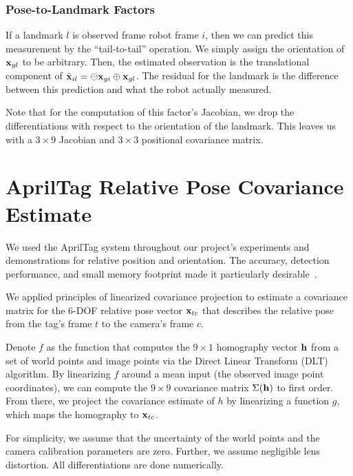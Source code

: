 \documentclass[conference]{IEEEtran}
\begin{document}
\subsubsection{Pose-to-Landmark Factors}
\label{subs:pointnodelinear}

If a landmark $l$ is observed frame robot frame $i$, then we can predict this measurement
by the ``tail-to-tail'' operation.  We simply assign the orientation of ${\bf x}_{gl}$ to
be arbitrary.  Then, the estimated observation is the translational component of $ {\hat
  {\bf x}}_{il} = \ominus {\bf x}_{gi} \oplus {\bf x}_{gl} $. The residual for the
landmark is the difference between this prediction and what the robot actually measured.

Note that for the computation of this factor's Jacobian, we drop the differentiations with
respect to the orientation of the landmark.  This leaves us with a $3 \times 9$ Jacobian
and $3 \times 3$ positional covariance matrix. 

\section{AprilTag Relative Pose Covariance Estimate}
\label{sec:apriltags}


We used the AprilTag system throughout our project's experiments and demonstrations for
relative position and orientation.  The accuracy, detection performance, and small memory
footprint made it particularly desirable~\cite{olson2011tags}.

We applied principles of linearized covariance projection to estimate a covariance matrix
for the 6-DOF relative pose vector ${\bf x}_{tc}$ that describes the relative pose from
the tag's frame $t$ to the camera's frame $c$.

Denote $f$ as the function that computes the $9 \times 1$ homography vector ${\bf h}$ from
a set of world points and image points via the Direct Linear Transform (DLT) algorithm.
By linearizing $f$ around a mean input (the observed image point coordinates), we can
compute the $9 \times 9$ covariance matrix $\Sigma({\bf h})$ to first order.  From there,
we project the covariance estimate of $h$ by linearizing a function $g$, which maps the
homography to ${\bf x}_{tc}$.

For simplicity, we assume that the uncertainty of the world points and the camera
calibration parameters are zero.  Further, we assume negligible lens distortion.  All
differentiations are done numerically.
\end{document}
